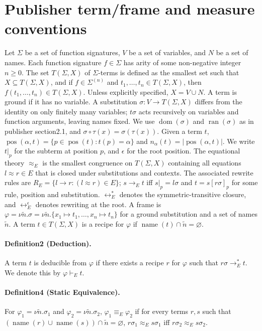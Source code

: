 \section*{Publisher term/frame and measure conventions}
Let $\Sigma$ be a set of function signatures, $V$ be a set of variables, and $N$ be a set of names. Each function signature $f\in\Sigma$ has arity of some non-negative integer $n\ge0$.
The set $T(\Sigma,X)$ of $\Sigma$-terms is defined as the smallest set such that $X\subseteq T(\Sigma,X)$, and if $f\in\Sigma^{(n)}$ and $t_1,\ldots,t_n\in T(\Sigma,X)$, then $f(t_1,\ldots,t_n)\in T(\Sigma,X)$. Unless explicitly specified, $X=V\cup N$.
A term is ground if it has no variable. A substitution $\sigma:V\to T(\Sigma,X)$ differs from the identity on only finitely many variables; $t\sigma$ acts recursively on variables and function arguments, leaving names fixed. We use $\operatorname{dom}(\sigma)$ and $\operatorname{ran}(\sigma)$ as in publisher section2.1, and $\sigma\circ\tau(x)=\sigma(\tau(x))$.
Given a term $t$, $\operatorname{pos}(\alpha,t)=\{p\in\operatorname{pos}(t):t(p)=\alpha\}$ and $n_\alpha(t)=|\operatorname{pos}(\alpha,t)|$. We write $t|_p$ for the subterm at position $p$, and $\epsilon$ for the root position.
The equational theory $\approx_E$ is the smallest congruence on $T(\Sigma,X)$ containing all equations $l\approx r\in E$ that is closed under substitutions and contexts. The associated rewrite rules are $R_E=\{l\to r:(l\approx r)\in E\}$; $s\to_E t$ iff $s|_p=l\sigma$ and $t=s[r\sigma]_p$ for some rule, position and substitution. $\leftrightarrow_E^*$ denotes the symmetric-transitive closure, and $\leftrightarrow_E^\epsilon$ denotes rewriting at the root.
A frame is $\varphi=\nu\tilde n.\sigma=\nu\tilde n.\{x_1\mapsto t_1,\ldots,x_n\mapsto t_n\}$ for a ground substitution and a set of names $\tilde n$.
A term $t\in T(\Sigma,X)$ is a recipe for $\varphi$ if $\operatorname{name}(t)\cap\tilde n=\varnothing$.
\paragraph{Definition2 (Deduction).} A term $t$ is deducible from $\varphi$ if there exists a recipe $r$ for $\varphi$ such that $r\sigma\to_E^*t$. We denote this by $\varphi\vdash_E t$.
\paragraph{Definition4 (Static Equivalence).} For $\varphi_1=\nu\tilde n.\sigma_1$ and $\varphi_2=\nu\tilde n.\sigma_2$, $\varphi_1\equiv_E\varphi_2$ if for every terms $r,s$ such that $(\operatorname{name}(r)\cup\operatorname{name}(s))\cap\tilde n=\varnothing$, $r\sigma_1\approx_Es\sigma_1$ iff $r\sigma_2\approx_Es\sigma_2$.
